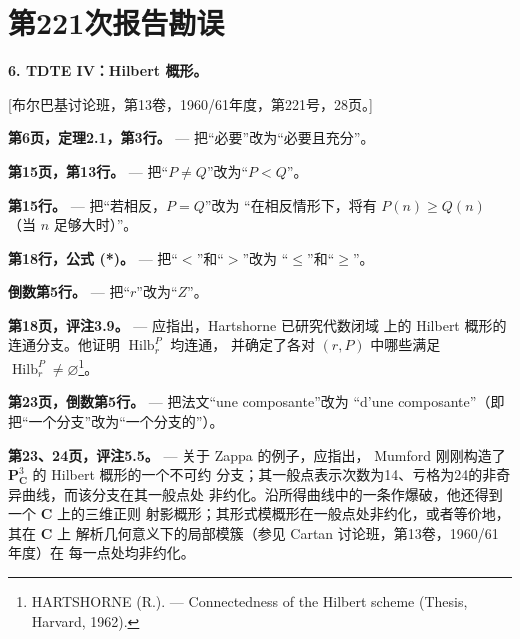 \clearpage
\chapter*{第221次报告勘误}
\setcounter{footnote}{3}

\noindent\textbf{6. TDTE IV：Hilbert 概形。}

\begin{center}
[布尔巴基讨论班，第13卷，1960/61年度，第221号，28页。]
\end{center}

\noindent\textbf{第6页，定理2.1，第3行。} --- 把“必要”改为“必要且充分”。

\noindent\textbf{第15页，第13行。} --- 把“$P\neq Q$”改为“$P<Q$”。

\noindent\textbf{第15行。} --- 把“若相反，$P=Q$”改为
“在相反情形下，将有 $P(n)\geq Q(n)$（当 $n$ 足够大时）”。

\noindent\textbf{第18行，公式 (*)。} --- 把“$<$”和“$>$”改为
“$\leq$”和“$\geq$”。

\noindent\textbf{倒数第5行。} --- 把“$r$”改为“$Z$”。

\noindent\textbf{第18页，评注3.9。} --- 应指出，Hartshorne 已研究代数闭域
上的 Hilbert 概形的连通分支。他证明 $\operatorname{Hilb}^{P}_{r}$ 均连通，
并确定了各对 $(r,P)$ 中哪些满足
$\operatorname{Hilb}^{P}_{r}\neq\varnothing$\footnote{HARTSHORNE (R.). --- Connectedness of the Hilbert
scheme (Thesis, Harvard, 1962).}。

\noindent\textbf{第23页，倒数第5行。} --- 把法文“une composante”改为
“d'une composante”（即把“一个分支”改为“一个分支的”）。

\noindent\textbf{第23、24页，评注5.5。} --- 关于 Zappa 的例子，应指出，
Mumford 刚刚构造了 $\mathbf P^3_{\mathbf C}$ 的 Hilbert 概形的一个不可约
分支；其一般点表示次数为14、亏格为24的非奇异曲线，而该分支在其一般点处
非约化。沿所得曲线中的一条作爆破，他还得到一个 $\mathbf C$ 上的三维正则
射影概形；其形式模概形在一般点处非约化，或者等价地，其在 $\mathbf C$ 上
解析几何意义下的局部模簇（参见 Cartan 讨论班，第13卷，1960/61年度）在
每一点处均非约化。

\par
